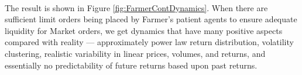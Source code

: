 \documentclass[runningheads]{llncs}
\begin{document}
\paragraph*{}
The result is shown in Figure \ref{fig:FarmerContDynamics}. When there are sufficient limit orders being placed by Farmer's patient agents to ensure adequate liquidity for Market orders, we get dynamics that have many positive aspects compared with reality --- approximately power law return distribution, volatility clustering, realistic variability in linear prices, volumes, and returns, and essentially no predictability of future returns based upon past returns.

\begin{figure}[htbp]
  \begin{center}
   \mbox{
      \quad
       \quad
}
\end{center}
\end{figure}
\end{document}
